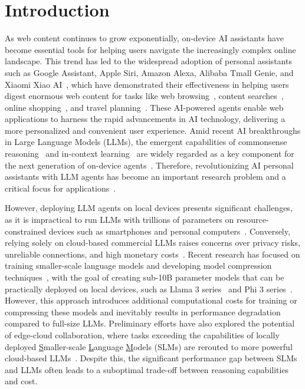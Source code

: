 \section{Introduction}

As web content continues to grow exponentially, on-device AI assistants have become essential tools for helping users navigate the increasingly complex online landscape. This trend has led to the widespread adoption of personal assistants such as Google Assistant, Apple Siri, Amazon Alexa, Alibaba Tmall Genie, and Xiaomi Xiao AI~\cite{kepuska2018next,mari2019voice}, which have demonstrated their effectiveness in helping users digest enormous web content for tasks like web browsing~\cite{lai2024autowebglm, chen2024large, zhou2024synergizing}, content searches~\cite{sharma2024generative}, online shopping~\cite{nie2024hybrid}, and travel planning~\cite{shao2024beyond, chiu2009towards}. These AI-powered agents enable web applications to harness the rapid advancements in AI technology, delivering a more personalized and convenient user experience. Amid recent AI breakthroughs in Large Language Models (LLMs), the emergent capabilities of commonsense reasoning~\cite{wei2022chain} and in-context learning~\cite{dong2022survey} are widely regarded as a key component for the next generation of on-device agents~\cite{gunter2024apple}. Therefore, revolutionizing AI personal assistants with LLM agents has become an important research problem and a critical focus for applications~\cite{li2024personal, li2024limp}.


However, deploying LLM agents on local devices presents significant challenges, as it is impractical to run LLMs with trillions of parameters on resource-constrained devices such as smartphones and personal computers~\cite{xu2024survey}. Conversely, relying solely on cloud-based commercial LLMs raises concerns over privacy risks, unreliable connections, and high monetary costs~\cite{li2024personal}. Recent research has focused on training smaller-scale language models and developing model compression techniques~\cite{xu2024device,lu2024small,lin2024awq}, with the goal of creating sub-10B parameter models that can be practically deployed on local devices, such as Llama 3 series~\cite{dubey2024llama} and Phi 3 series~\cite{abdin2024phi}. However, this approach introduces additional computational costs for training or compressing these models and inevitably results in performance degradation compared to full-size LLMs. Preliminary efforts have also explored the potential of edge-cloud collaboration, where tasks exceeding the capabilities of locally deployed \underline{S}maller-scale \underline{L}anguage \underline{M}odels (SLMs) are rerouted to more powerful cloud-based LLMs~\cite{chen2023frugalgpt,gupta2024language}. Despite this, the significant performance gap between SLMs and LLMs often leads to a suboptimal trade-off between reasoning capabilities and cost. 


